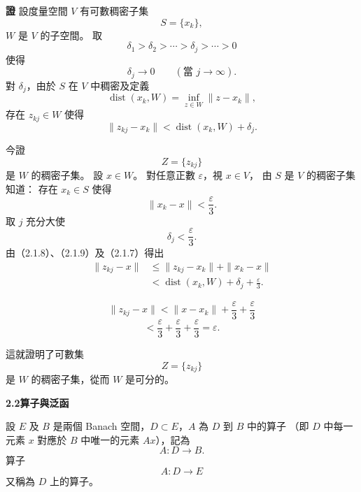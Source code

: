 \documentclass[11pt,a4paper,twoside]{article}
\newcommand{\pnum}[1]{%
    \makebox[0pt][r]{%
        \scriptsize\textbf{[#1]}\hspace{0.7em}%
    }%
}
\begin{document}
\noindent
\pnum{65}
\textbf{證}\quad
設度量空間 $V$ 有可數稠密子集
\[
    S=\{x_k\},
\]
$W$ 是 $V$ 的子空間。
取
\[
    \delta_1>\delta_2>\cdots>\delta_j>\cdots>0
\]
使得
\[
    \delta_j\to0
    \qquad
    (\text{當 }j\to\infty).
\]
對 $\delta_j$，由於 $S$ 在 $V$ 中稠密及定義
\begin{equation}
    \operatorname{dist}(x_k,W)
    =
    \inf_{z\in W}\|z-x_k\|,
    \tag{2.1.7}
\end{equation}
存在 $z_{kj}\in W$ 使得
\begin{equation}
    \|z_{kj}-x_k\|
    <
    \operatorname{dist}(x_k,W)+\delta_j.
    \tag{2.1.8}
\end{equation}

\noindent
\pnum{66}
今證
\[
    Z=\{z_{kj}\}
\]
是 $W$ 的稠密子集。
設 $x\in W$。
對任意正數 $\varepsilon$，視 $x\in V$，
由 $S$ 是 $V$ 的稠密子集知道：
存在 $x_k\in S$ 使得
\begin{equation}
    \|x_k-x\|<\frac{\varepsilon}{3}.
    \tag{2.1.9}
\end{equation}
取 $j$ 充分大使
\[
    \delta_j<\frac{\varepsilon}{3}.
\]
由（2.1.8）、（2.1.9）及（2.1.7）得出
\[
    \begin{aligned}
        \|z_{kj}-x\|
         & \le
        \|z_{kj}-x_k\|
        +
        \|x_k-x\|
        \\
         & <
        \operatorname{dist}(x_k,W)
        +
        \delta_j
        +
        \frac{\varepsilon}{3}.
    \end{aligned}
\]

\newpage

\noindent
\pnum{67}
\[
    \|z_{kj}-x\|
    <
    \|x-x_k\|
    +
    \frac{\varepsilon}{3}
    +
    \frac{\varepsilon}{3}
\]
\[
    <
    \frac{\varepsilon}{3}
    +
    \frac{\varepsilon}{3}
    +
    \frac{\varepsilon}{3}
    =
    \varepsilon.
\]

這就證明了可數集
\[
    Z=\{z_{kj}\}
\]
是 $W$ 的稠密子集，從而 $W$ 是可分的。

\vspace{0.8em}

\noindent
\textbf{2.2\qquad 算子與泛函}

\vspace{0.6em}

\noindent
\pnum{68}
設 $E$ 及 $B$ 是兩個 Banach 空間，$D\subset E$，$A$ 為 $D$ 到 $B$ 中的算子
（即 $D$ 中每一元素 $x$ 對應於 $B$ 中唯一的元素 $Ax$），記為
\[
    A:D\longrightarrow B.
\]
算子
\[
    A:D\longrightarrow E
\]
又稱為 $D$ 上的算子。
\end{document}
